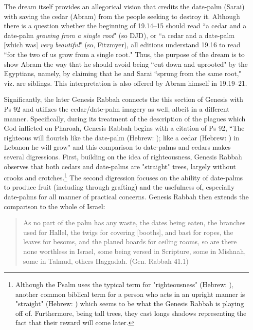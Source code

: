 The dream itself provides an allegorical vision that credits the date-palm (Sarai) with saving the cedar (Abram) from the people seeking to destroy it. Although there is a question whether the beginning of 19.14--15 should read  ``a cedar and a date-palm \emph{growing from a single root}" (so DJD), or  ``a cedar and a date-palm [which was] \emph{very beautiful}" (so, Fitzmyer), all editions understand 19.16 to read  ``for the two of us grow from a single root." Thus, the purpose of the dream  is to show Abram the way that he should avoid being ``cut down and uprooted" by the Egyptians, namely, by claiming that he and Sarai ``sprung from the same root," viz. are siblings. This interpretation is also offered by Abram himself in 19.19--21.

Significantly, the later Genesis Rabbah connects the this section of Genesis with Ps 92 and utilizes the cedar/date-palm imagery as well, albeit in a different manner. Specifically, during its treatment of the description of the plagues which God inflicted on Pharoah, Genesis Rabbah begins with a citation of Ps 92, ``The righteous will flourish like the date-palm (Hebrew: ); like a cedar (Hebrew: ) in Lebanon he will grow" and this comparison to date-palms and cedars makes several digressions. First, building on the idea of righteousness, Genesis Rabbah observes that both cedars and date-palms are "straight" trees, largely without crooks and crotches.\footnote{Although the Psalm uses the typical term for "righteousness" (Hebrew: ), another common biblical term for a person who acts in an upright manner is "straight" (Hebrew: ) which seems to be what the Genesis Rabbah is playing off of. Furthermore, being tall trees, they cast longs shadows representing the fact that their reward will come later.} The second digression focuses on the ability of date-palms to produce fruit (including through grafting) and the usefulness of, especially date-palms for all manner of practical concerns. Genesis Rabbah then extends the comparison to the whole of Israel:

\begin{quote}
As no part of the palm has any waste, the dates being eaten, the branches used for Hallel, the twigs for covering [booths], and bast for ropes, the leaves for besoms, and the planed boards for ceiling rooms, so are there none worthless in Israel, some being versed in Scripture, some in Mishnah, some in Talmud, others Haggadah. (Gen. Rabbah 41.1)
\end{quote}

